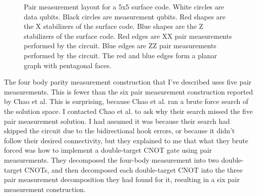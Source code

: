 \documentclass[onecolumn,unpublished,a4paper]{quantumarticle}
\theoremstyle{definition}
\theoremstyle{definition}
\theoremstyle{definition}
\begin{document}
\begin{figure}
    \centering
    \caption{
        Pair measurement layout for a 5x5 surface code.
        White circles are data qubits.
        Black circles are measurement qubits.
        Red shapes are the X stabilizers of the surface code.
        Blue shapes are the Z stabilizers of the surface code.
        Red edges are XX pair measurements performed by the circuit.
        Blue edges are ZZ pair measurements performed by the circuit.
        The red and blue edges form a planar graph with pentagonal faces.
    }
    \label{fig:tiling}
\end{figure}

The four body parity measurement construction that I've described uses five pair measurements.
This is fewer than the six pair measurement construction reported by Chao et al.
This is surprising, because Chao et al. ran a brute force search of the solution space.
I contacted Chao et al. to ask why their search missed the five pair measurement solution.
I had assumed it was because their search had skipped the circuit due to the bidirectional hook errors, or because it didn't follow their desired connectivity, but they explained to me that what they brute forced was how to implement a double-target CNOT gate using pair measurements.
They decomposed the four-body measurement into two double-target CNOTs, and then decomposed each double-target CNOT into the three pair measurement decomposition they had found for it, resulting in a six pair measurement construction.
\end{document}
